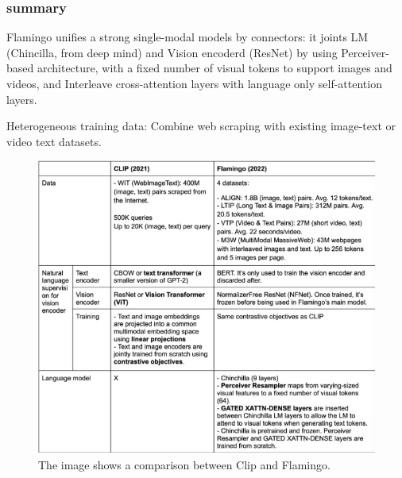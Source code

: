 \subsubsection{summary}

Flamingo unifies a strong single-modal models by connectors: it joints LM (Chincilla, from deep mind) and Vision encoderd (ResNet) by using Perceiver-based architecture, with a fixed number of visual tokens to support images and videos, and Interleave cross-attention layers with language only self-attention layers.

Heterogeneous training data:  Combine web scraping with existing image-text or video text datasets.



\begin{figure}[H]
    \centering
    \includegraphics[width=1\linewidth]{tikz/Clip vs Flamingo.png}
    \caption{The image shows a comparison between Clip and Flamingo.}
    \label{fig:enter-label}
\end{figure}








